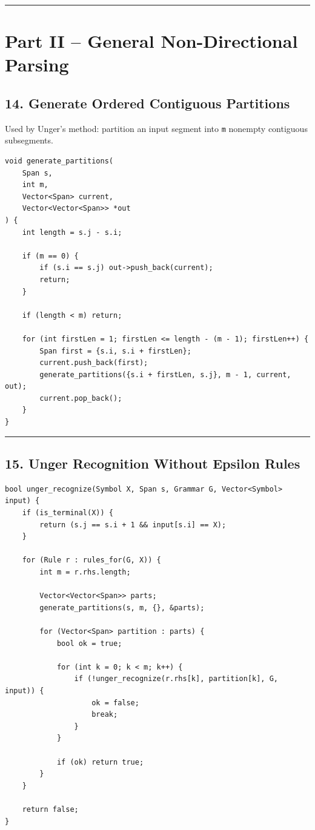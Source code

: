 \documentclass[10pt,letterpaper]{article}
\begin{document}
\medskip\hrule\medskip

\clearpage
\section*{Part II -- General Non-Directional Parsing}

\subsection*{14. Generate Ordered Contiguous Partitions}

Used by Unger's method: partition an input segment into \texttt{m} nonempty contiguous subsegments.

\begin{verbatim}
void generate_partitions(
    Span s,
    int m,
    Vector<Span> current,
    Vector<Vector<Span>> *out
) {
    int length = s.j - s.i;

    if (m == 0) {
        if (s.i == s.j) out->push_back(current);
        return;
    }

    if (length < m) return;

    for (int firstLen = 1; firstLen <= length - (m - 1); firstLen++) {
        Span first = {s.i, s.i + firstLen};
        current.push_back(first);
        generate_partitions({s.i + firstLen, s.j}, m - 1, current, out);
        current.pop_back();
    }
}
\end{verbatim}

\medskip\hrule\medskip

\subsection*{15. Unger Recognition Without Epsilon Rules}

\begin{verbatim}
bool unger_recognize(Symbol X, Span s, Grammar G, Vector<Symbol> input) {
    if (is_terminal(X)) {
        return (s.j == s.i + 1 && input[s.i] == X);
    }

    for (Rule r : rules_for(G, X)) {
        int m = r.rhs.length;

        Vector<Vector<Span>> parts;
        generate_partitions(s, m, {}, &parts);

        for (Vector<Span> partition : parts) {
            bool ok = true;

            for (int k = 0; k < m; k++) {
                if (!unger_recognize(r.rhs[k], partition[k], G, input)) {
                    ok = false;
                    break;
                }
            }

            if (ok) return true;
        }
    }

    return false;
}
\end{verbatim}
\end{document}
